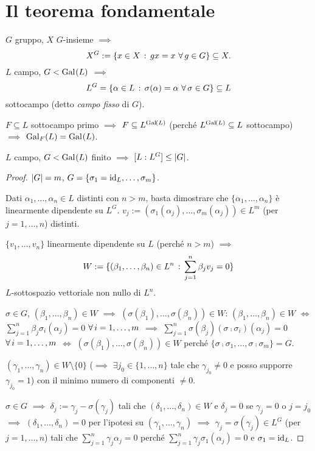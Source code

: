 \section{Il teorema fondamentale}


$G$ gruppo, $X$ $G$-insieme $\implies$
\[
X^G:=\{x\in X\st gx=x\ \all g\in G\}\subseteq X.
\]
$L$ campo, $G<\Gal{L}$ $\implies$
\[
L^G=\{\alpha\in L\st\sigma(\alpha)=\alpha\ \all\sigma\in G\}\subseteq L
\]
sottocampo (detto {\em campo fisso} di $G$).
\begin{osse}
$F\subseteq L$ sottocampo primo $\implies$ $F\subseteq L^{\Gal{L}}$ (perché $L^{\Gal{L}}\subseteq L$ sottocampo) $\implies$ $\Gal[F]{L}=\Gal{L}$.
\end{osse}
\begin{teor}[Artin]
$L$ campo, $G<\Gal{L}$ finito $\implies$ $[L:L^G]\le\card{G}$.
\end{teor}
\begin{proof}
$\card{G}=m$, $G=\{\sigma_1=\id_L,\dots,\sigma_m\}$.

Dati $\alpha_1,\dots,\alpha_n\in L$ distinti con $n>m$, basta dimostrare che $\{\alpha_1,\dots,\alpha_n\}$ è linearmente dipendente su $L^G$.
$v_j:=(\sigma_1(\alpha_j),\dots,\sigma_m(\alpha_j))\in L^m$ (per $j=1,\dots,n$) distinti.
\smallskip

$\{v_1,\dots,v_n\}$ linearmente dipendente su $L$ (perché $n>m$) $\implies$
\[
W:=\{(\beta_1,\dots,\beta_n)\in L^n\st\sum_{j=1}^n\beta_jv_j=0\}
\]
$L$-sottospazio vettoriale non nullo di $L^n$.
\smallskip

$\sigma\in G$, $(\beta_1,\dots,\beta_n)\in W$ $\implies$ $(\sigma(\beta_1),\dots,\sigma(\beta_n))\in W$: $(\beta_1,\dots,\beta_n)\in W$ $\iff$ $\sum_{j=1}^n\beta_j\sigma_i(\alpha_j)=0$ $\all i=1,\dots,m$ $\implies$ $\sum_{j=1}^n\sigma(\beta_j)(\sigma\comp\sigma_i)(\alpha_j)=0$ $\all i=1,\dots,m$ $\iff$ $(\sigma(\beta_1),\dots,\sigma(\beta_n))\in W$ perché $\{\sigma\comp\sigma_1,\dots,\sigma\comp\sigma_m\}=G$.
\smallskip

$(\gamma_1,\dots,\gamma_n)\in W\setminus\{0\}$ ($\implies$ $\exi j_0\in\{1,\dots,n\}$ tale che $\gamma_{j_0}\ne0$ e posso supporre $\gamma_{j_0}=1$) con il minimo numero di componenti $\ne0$.
\smallskip

$\sigma\in G$ $\implies$ $\delta_j:=\gamma_j-\sigma(\gamma_j)$ tali che $(\delta_1,\dots,\delta_n)\in W$ e $\delta_j=0$ se $\gamma_j=0$ o $j=j_0$ $\implies$ $(\delta_1,\dots,\delta_n)=0$ per l'ipotesi su $(\gamma_1,\dots,\gamma_n)$ $\implies$ $\gamma_j=\sigma(\gamma_j)\in L^G$ (per $j=1,\dots,n$) tali che $\sum_{j=1}^n\gamma_j\alpha_j=0$ perché $\sum_{j=1}^n\gamma_j\sigma_1(\alpha_j)=0$ e $\sigma_1=\id_L$.
\end{proof}


